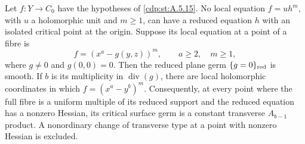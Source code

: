 
\begin{proposition}\label{cdp:st:A.5.17}
Let $f:Y\to C_0$ have the hypotheses of \ref{cdp:st:A.5.15}.
No local equation $f=u h^m$, with $u$ a holomorphic
unit and $m\ge1$, can have a reduced equation $h$
with an isolated critical point at the origin.
Suppose its local equation at a point of a fibre is
\[
             f=(x^a-g(y,z))^m,
             \qquad a\ge2,\quad m\ge1,             \tag{A.J.38}\label{cdp:eq:A.J.38}
\]
where $g\ne0$ and $g(0,0)=0$. Then the reduced
plane germ $\{g=0\}_{\rm red}$ is smooth. If
$b$ is its multiplicity in $\operatorname{div}(g)$,
there are local holomorphic coordinates in which
$f=(x^a-y^b)^m$.
Consequently, at every point where the full fibre
is a uniform multiple of its reduced support and
the reduced equation has a nonzero Hessian, its
critical surface germ is a constant
transverse $A_{b-1}$ product. A nonordinary change
of transverse type at a point with nonzero Hessian
is excluded.
\end{proposition}

